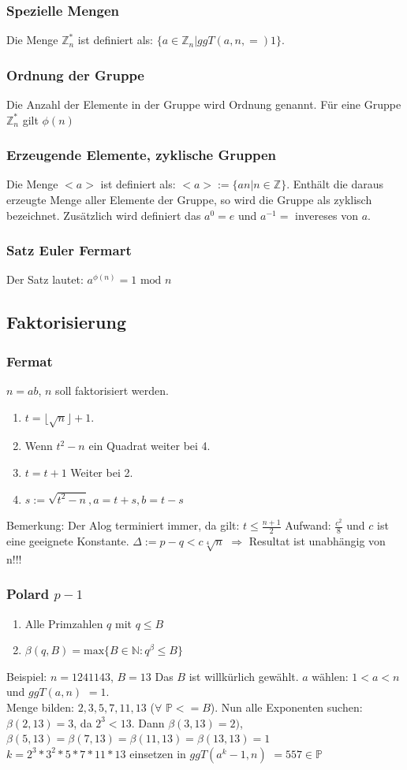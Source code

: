 \documentclass[10pt]{article}
\newcommand{\ZN}{\mathbb{Z}} %
\newcommand{\PN}{\mathbb{P}} %
\newcommand{\T}[1]{\text{#1}} %
\newcommand{\Ra}{\Rightarrow}
\begin{document}
\subsubsection{Spezielle Mengen}
Die Menge $\ZN^*_n$ ist definiert als: $\{a \in \ZN_n|ggT(a,n,=)1\}$.
\subsubsection{Ordnung der Gruppe}
Die Anzahl der Elemente in der Gruppe wird Ordnung genannt. Für eine Gruppe $\ZN^*_n$ gilt $\phi(n)$
\subsubsection{Erzeugende Elemente, zyklische Gruppen}
Die Menge $<a>$ ist definiert als: $<a>:= \{an|n \in \ZN\}$. Enthält die daraus erzeugte Menge aller Elemente der Gruppe, so wird die Gruppe als zyklisch bezeichnet. Zusätzlich wird definiert das $a^0 = e$ und $a^{-1} =$ invereses von $a$.
\subsubsection{Satz Euler Fermart}
Der Satz lautet: $a^{\phi(n)} = 1\T{ mod }n$
\subsection{Faktorisierung}
\subsubsection{Fermat}
$n=ab$, $n$ soll faktorisiert werden. 
\begin{enumerate}
\item $t = \lfloor \sqrt n \rfloor + 1$. 
\item Wenn $t^2 - n$ ein Quadrat weiter bei 4.
\item $t = t + 1$ Weiter bei 2.
\item $s := \sqrt{t^2 -n}, a = t + s, b = t - s$
\end{enumerate}
Bemerkung: Der Alog terminiert immer, da gilt: $t \le \frac{n+1}{2}$
Aufwand: $\frac{c^2}{8}$ und $c$ ist eine geeignete Konstante. $\Delta := p-q < c \sqrt[4]{n}$ {\color{red} $\Ra$ Resultat ist unabhängig von n!!!} 

\subsubsection{Polard $p -1$}
\begin{enumerate}
\item Alle Primzahlen $q$ mit $q \le B$
\item $\beta(q, B) = \text{max}\{B \in \mathbb{N}: q^\beta \le B\}$
\end{enumerate}
Beispiel:
$n=1241143$, $B=13$ Das $B$ ist willkürlich gewählt. $a$ wählen: $ 1 < a < n$ und $ggT(a, n)$ $= 1$. \\
Menge bilden: ${2, 3, 5, 7, 11, 13}$ ($\forall$ $\PN<=B$). Nun alle Exponenten suchen: $\beta (2, 13) = 3$, da $2^3 < 13$. Dann $\beta (3, 13) = 2)$, 
$\beta (5, 13) = \beta (7, 13) = \beta (11, 13) = \beta (13, 13) = 1$ \\
$k = 2^3 * 3^2 * 5 * 7 * 11 * 13$ einsetzen in $ggT(a^k-1, n)$ $= 557 \in \PN$
\end{document}
